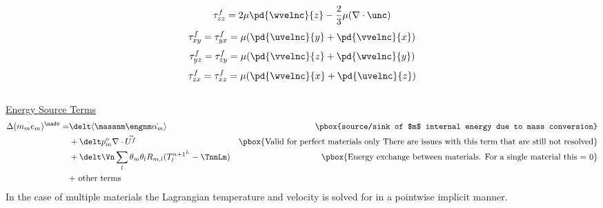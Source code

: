 \documentclass[fleqn]{article}
\begin{document}
{\begin{equation}
    \tau^{f}_{zz} = 2\mu \pd{\wvelnc}{z} - \frac{2}{3}\mu(\nabla \cdot \unc)
\end{equation}
%
\begin{equation}
    \tau^{f}_{xy} = \tau^{f}_{yx} =\mu (\pd{\uvelnc}{y} + \pd{\vvelnc}{x})
\end{equation}
%
\begin{equation}
    \tau^{f}_{yz} = \tau^{f}_{zy} =\mu (\pd{\vvelnc}{z} + \pd{\wvelnc}{y})
\end{equation}
%
\begin{equation}
    \label{eq:tau_zx}
    \tau^{f}_{zx} = \tau^{f}_{xz} =\mu (\pd{\wvelnc}{x} + \pd{\uvelnc}{z})
\end{equation}
\\
\underline{\textsf{Energy Source Terms}}
\begin{alignat}{3}
    \Delta( m_m e_{m})^{\nadv}  = 
&   \delt \langle \massnm \engnm \dot{\alpha_{m}}\rangle 
&   \text{\pbox{source/sink of $m$ internal energy due to mass conversion}} \\
&+  \delt p^{o}_m \nabla \cdot \vec{U^f} 
&   \text{\pbox{Valid for perfect materials only There are issues with this term that are still not resolved}}\\
&+  \delt \Vn \sum_l \theta_m \theta_l R_{m,l}(T^{n+1^{L}}_l - \TnnLm )
&   \text{\pbox{Energy exchange between materials.  For a single material this = 0}}\\
&   \text{+  other terms}
\end{alignat}
In the case of multiple materials the Lagrangian temperature and velocity
is solved for in a pointwise implicit manner.
%
%
%
%
}
\end{document}
